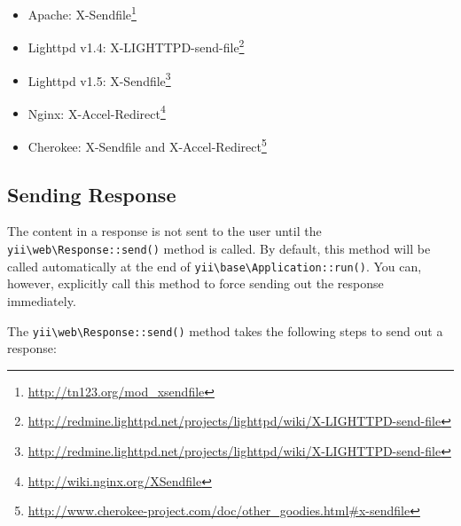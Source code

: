 \begin{itemize}
\item Apache: X-Sendfile\footnote{\url{http://tn123.org/mod\_xsendfile}}
\item Lighttpd v1.4: X-LIGHTTPD-send-file\footnote{\url{http://redmine.lighttpd.net/projects/lighttpd/wiki/X-LIGHTTPD-send-file}}
\item Lighttpd v1.5: X-Sendfile\footnote{\url{http://redmine.lighttpd.net/projects/lighttpd/wiki/X-LIGHTTPD-send-file}}
\item Nginx: X-Accel-Redirect\footnote{\url{http://wiki.nginx.org/XSendfile}}
\item Cherokee: X-Sendfile and X-Accel-Redirect\footnote{\url{http://www.cherokee-project.com/doc/other\_goodies.html\#x-sendfile}}
\end{itemize}
\subsection{Sending Response \label{runtime-responses.md::sending-response}}
The content in a response is not sent to the user until the \texttt{yii{\allowbreak{}\textbackslash}web{\allowbreak{}\textbackslash}Response\allowbreak{}::\allowbreak{}send()} method is called.
By default, this method will be called automatically at the end of \texttt{yii{\allowbreak{}\textbackslash}base{\allowbreak{}\textbackslash}Application\allowbreak{}::\allowbreak{}run()}. You can, however,
explicitly call this method to force sending out the response immediately.

The \texttt{yii{\allowbreak{}\textbackslash}web{\allowbreak{}\textbackslash}Response\allowbreak{}::\allowbreak{}send()} method takes the following steps to send out a response:

